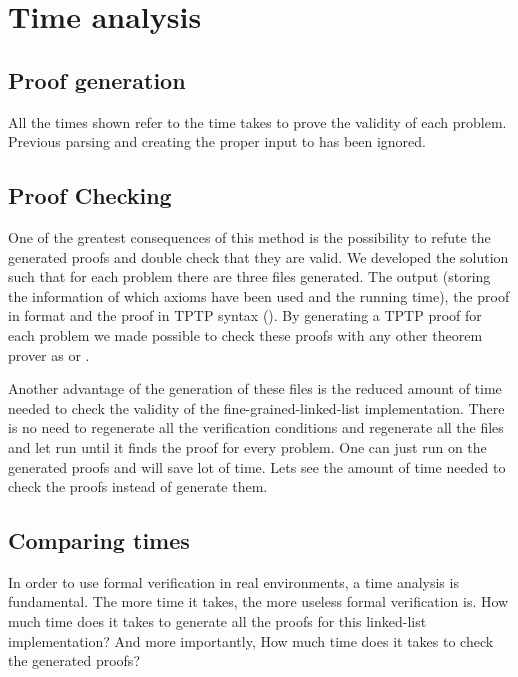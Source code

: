 \section{Time analysis}
\label{sec:timeanalysis}

\subsection{Proof generation}

All the times shown refer to the time \spass takes to prove the validity of each problem. 
%
Previous parsing and creating the proper input to \spass has been ignored.


\subsection{Proof Checking}

One of the greatest consequences of this method is the possibility to refute the generated proofs and double check that they are valid.
%
We developed the solution such that for each \spass problem there are three files generated. 
%
The \spass output (storing the information of which axioms have been used and the running time), the \spass proof in \spass format and the \spass proof in TPTP syntax (\cite{tptp}).
%
By generating a TPTP proof for each \spass problem we made possible to check these proofs with any other theorem prover as  or .

Another advantage of the generation of these files is the reduced amount of time needed to check the validity of the fine-grained-linked-list implementation. 
%
There is no need to regenerate all the verification conditions and regenerate all the \spass files and let \spass run until it finds the proof for every problem. 
%
One can just run \spass on the generated proofs and will save lot of time.
%
Lets see the amount of time needed to check the proofs instead of generate them.


\subsection{Comparing times}

In order to use formal verification in real environments, a time analysis is fundamental. 
%
The more time it takes, the more useless formal verification is.
%
How much time does it takes to generate all the proofs for this linked-list implementation? 
%
And more importantly,  How much time does it takes to check the generated proofs? 

